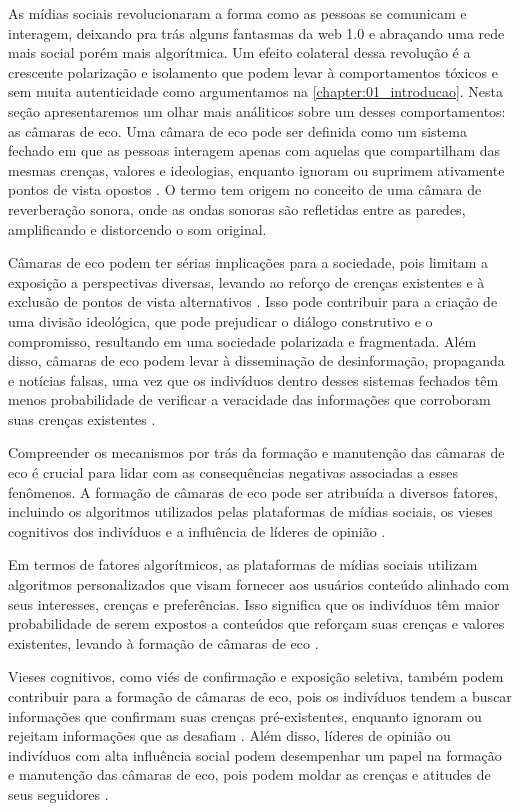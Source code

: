 As mídias sociais revolucionaram a forma como as pessoas se comunicam e interagem, deixando pra trás alguns fantasmas da web 1.0 e abraçando uma rede mais social porém mais algorítmica. Um efeito colateral dessa revolução é a crescente polarização e isolamento que podem levar à comportamentos tóxicos e sem muita autenticidade como argumentamos na \autoref{chapter:01_introducao}. Nesta seção apresentaremos um olhar mais análiticos sobre um desses comportamentos: as câmaras de eco. Uma câmara de eco pode ser definida como um sistema fechado em que as pessoas interagem apenas com aquelas que compartilham das mesmas crenças, valores e ideologias, enquanto ignoram ou suprimem ativamente pontos de vista opostos \cite[]{2015_Bakshy}. O termo tem origem no conceito de uma câmara de reverberação sonora, onde as ondas sonoras são refletidas entre as paredes, amplificando e distorcendo o som original.

Câmaras de eco podem ter sérias implicações para a sociedade, pois limitam a exposição a perspectivas diversas, levando ao reforço de crenças existentes e à exclusão de pontos de vista alternativos \cite[]{2001_Sunstein_BOOK}. Isso pode contribuir para a criação de uma divisão ideológica, que pode prejudicar o diálogo construtivo e o compromisso, resultando em uma sociedade polarizada e fragmentada. Além disso, câmaras de eco podem levar à disseminação de desinformação, propaganda e notícias falsas, uma vez que os indivíduos dentro desses sistemas fechados têm menos probabilidade de verificar a veracidade das informações que corroboram suas crenças existentes \cite[]{2016_Vicario}.

Compreender os mecanismos por trás da formação e manutenção das câmaras de eco é crucial para lidar com as consequências negativas associadas a esses fenômenos. A formação de câmaras de eco pode ser atribuída a diversos fatores, incluindo os algoritmos utilizados pelas plataformas de mídias sociais, os vieses cognitivos dos indivíduos e a influência de líderes de opinião \cite[]{2016_Flaxman}.

Em termos de fatores algorítmicos, as plataformas de mídias sociais utilizam algoritmos personalizados que visam fornecer aos usuários conteúdo alinhado com seus interesses, crenças e preferências. Isso significa que os indivíduos têm maior probabilidade de serem expostos a conteúdos que reforçam suas crenças e valores existentes, levando à formação de câmaras de eco \cite[]{2015_Bakshy}.

Vieses cognitivos, como viés de confirmação e exposição seletiva, também podem contribuir para a formação de câmaras de eco, pois os indivíduos tendem a buscar informações que confirmam suas crenças pré-existentes, enquanto ignoram ou rejeitam informações que as desafiam \cite[]{2006_Taber}. Além disso, líderes de opinião ou indivíduos com alta influência social podem desempenhar um papel na formação e manutenção das câmaras de eco, pois podem moldar as crenças e atitudes de seus seguidores \cite[]{2015_Bakshy}.

